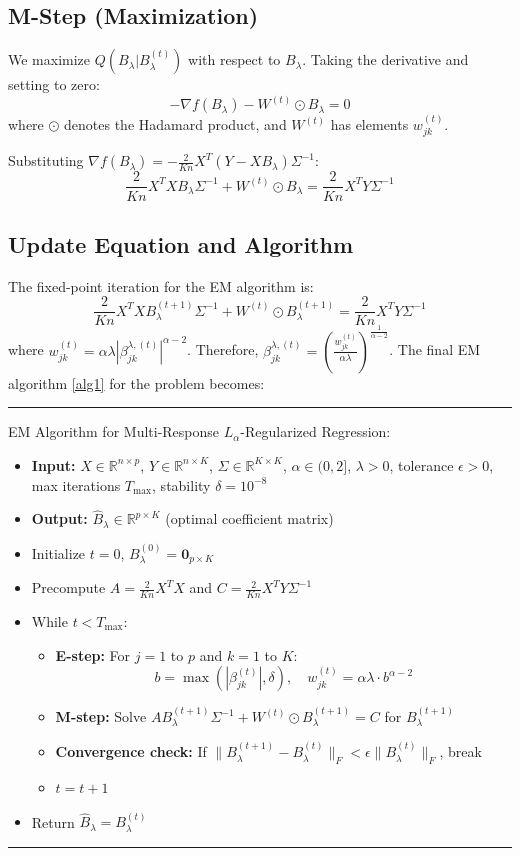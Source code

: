 \documentclass[twoside]{article}
\begin{document}
\subsection*{M-Step (Maximization)}
We maximize \(Q(B_\lambda | B_\lambda^{(t)})\) with respect to \(B_\lambda\). Taking the derivative and setting to zero:
$$ -\nabla f(B_\lambda) - W^{(t)} \odot B_\lambda = 0 $$
where \(\odot\) denotes the Hadamard product, and \(W^{(t)}\) has elements \(w_{jk}^{(t)}\).



Substituting \(\nabla f(B_\lambda) = -\frac{2}{Kn} X^T (Y - X B_\lambda) \Sigma^{-1}\):
$$ \frac{2}{Kn} X^T X B_\lambda \Sigma^{-1} + W^{(t)} \odot B_\lambda = \frac{2}{Kn} X^T Y \Sigma^{-1} $$



\subsection{Update Equation and Algorithm}
The fixed-point iteration for the EM algorithm is:
$$ \frac{2}{Kn} X^T X B_\lambda^{(t+1)} \Sigma^{-1} + W^{(t)} \odot B_\lambda^{(t+1)} = \frac{2}{Kn} X^T Y \Sigma^{-1} $$
where \(w_{jk}^{(t)} = \alpha \lambda |\beta_{jk}^{\lambda, (t)}|^{\alpha-2}\). Therefore, \(\beta_{jk}^{\lambda, (t)} = \left( \frac{w_{jk}^{(t)}}{\alpha \lambda} \right)^{\frac{1}{\alpha-2}}\).
The final EM algorithm \ref{alg1} for the problem becomes: \pagebreak
{ \linespread{0.5} \hrule
\begin{alg}\label{alg1}
EM Algorithm for Multi-Response $L_\alpha$-Regularized Regression:
\begin{itemize}
\item \textbf{Input:} $X \in \mathbb{R}^{n \times p}$, $Y \in \mathbb{R}^{n \times K}$, $\Sigma \in \mathbb{R}^{K \times K}$, $\alpha \in (0,2]$, $\lambda > 0$, tolerance $\epsilon > 0$, max iterations $T_{\max}$, stability $\delta = 10^{-8}$
\item \textbf{Output:} $\hat{B}_\lambda \in \mathbb{R}^{p \times K}$ (optimal coefficient matrix)
\item Initialize $t = 0$, $B_\lambda^{(0)} = \mathbf{0}_{p \times K}$
\item Precompute $A = \frac{2}{Kn} X^T X$ and $C = \frac{2}{Kn} X^T Y \Sigma^{-1}$
\item While $t < T_{\max}$:
\begin{itemize}
\item \textbf{E-step:} For $j = 1$ to $p$ and $k = 1$ to $K$:
$$ b = \max(|\beta_{jk}^{(t)}|, \delta), \quad w_{jk}^{(t)} = \alpha \lambda \cdot b^{\alpha-2} $$
\item \textbf{M-step:} Solve $A B_\lambda^{(t+1)} \Sigma^{-1} + W^{(t)} \odot B_\lambda^{(t+1)} = C$ for $B_\lambda^{(t+1)}$
\item \textbf{Convergence check:} If $\|B_\lambda^{(t+1)} - B_\lambda^{(t)}\|_F < \epsilon \|B_\lambda^{(t)}\|_F$, break
\item $t = t + 1$
\end{itemize}
\item Return $\hat{B}_\lambda = B_\lambda^{(t)}$
\end{itemize}
\end{alg} \hrule}
\end{document}
